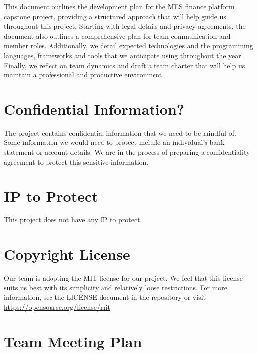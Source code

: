\documentclass{article}
\begin{document}
\newpage{}


This document outlines the development plan for the MES finance platform capstone project, providing a structured approach that will help guide us throughout this project. Starting with legal details and privacy agreements, the document also outlines a comprehensive plan for team communication and member roles. Additionally, we detail expected technologies and the programming languages, frameworks and tools that we anticipate using throughout the year. Finally, we reflect on team dynamics and draft a team charter that will help us maintain a professional and productive environment.

\section{Confidential Information?}

The project contains confidential information that we need to be mindful of. Some information we would need to protect include an individual's bank statement or account details. We are in the process of preparing a confidentiality agreement to protect this sensitive information.

\section{IP to Protect}

This project does not have any IP to protect. 

\section{Copyright License}

Our team is adopting the MIT license for our project. We feel that this license suits us best with its simplicity and relatively loose restrictions. For more information, see the LICENSE document in the repository or visit \url{https://opensource.org/license/mit}

\section{Team Meeting Plan}
\end{document}
